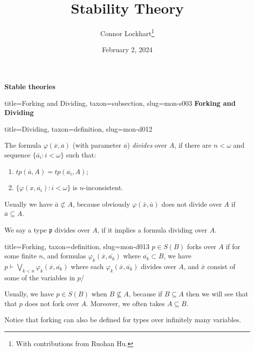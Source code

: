 \documentclass[a4paper]{article}
\title{Stability Theory}
\date{February 2, 2024}
\author{Connor Lockhart\thanks{With contributions from Ruohan Hu.}}
\begin{document}
\maketitle
\par{\textbf{Stable theories}}
\begin{tree}{title={Forking and Dividing}, taxon={subsection}, slug={mon-s003}}
\textbf{Forking and Dividing}
\begin{tree}{title={Dividing}, taxon={definition}, slug={mon-d012}}

The formula \(\varphi ( \overline {x}, \overline {a})\) (with parameter \(\overline {a}\)) \emph{divides} over \(A\), if there are \(n< \omega\) and sequence \(\{ \overline {a_i}:i< \omega \}\) such that:
\begin{enumerate}
\item{\(tp( \overline {a},A)=tp( \overline {a_i},A)\);}
    \item{\(\{ \varphi (x, \overline {a_i}):i< \omega \}\) is \(n\)-inconsistent.}
\end{enumerate}
Usually we have \(\bar {a} \not \subset  A\), because obviously \(\varphi ( \bar {x}, \bar {a})\) does not divide over \(A\) if \(\bar {a} \subseteq  A\).

We say a type \(\mathfrak {p}\) divides over \(A\), if it implies a formula dividing over \(A\).

\end{tree}

\begin{tree}{title={Forking}, taxon={definition}, slug={mon-d013}}
 \(p \in  S(B)\) forks over \(A\) if for some finite \(n\), and formulas \(\varphi _k( \overline {x}, \overline {a_{k}})\) where \(\overline {a_k} \subset  B\), we have \(p \vdash \bigvee _{k<n} \varphi _k( \overline {x}, \overline {a_{k}})\) where each \(\varphi _k( \overline {x}, \overline {a_{k}})\) divides over \(A\), and \(\bar {x}\) consist of some of the variables in \(p\)/

Usually, we have \(p \in  S(B)\) when \(B \not \subseteq  A\), because if \(B \subseteq  A\) then we will see that that \(p\) does not fork over \(A\). Moreover, we often takes \(A \subseteq  B\).

Notice that forking can also be defined for types over infinitely many variables.

\end{tree}

\end{tree}

\printbibliography
\end{document}
